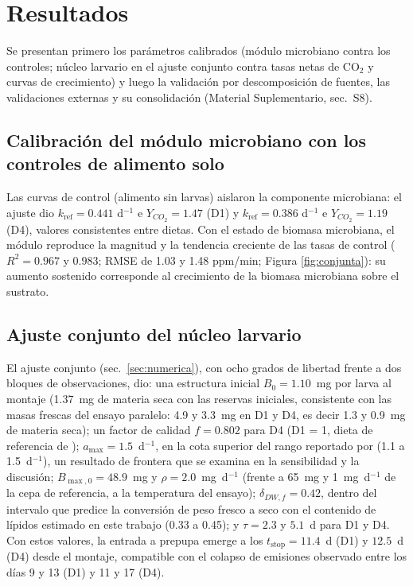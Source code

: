 \section{Resultados}
\label{sec:resultados}

Se presentan primero los parámetros calibrados (módulo microbiano contra los controles; núcleo larvario en el ajuste conjunto contra tasas netas de CO$_2$ y curvas de crecimiento) y luego la validación por descomposición de fuentes, las validaciones externas y su consolidación (Material Suplementario, sec.~S8).


\subsection{Calibración del módulo microbiano con los controles de alimento solo}

Las curvas de control (alimento sin larvas) aislaron la componente microbiana: el ajuste dio $k_{\mathrm{ref}} = 0.441$ d$^{-1}$ e $Y_{CO_2} = 1.47$ (D1) y $k_{\mathrm{ref}} = 0.386$ d$^{-1}$ e $Y_{CO_2} = 1.19$ (D4), valores consistentes entre dietas. Con el estado de biomasa microbiana, el módulo reproduce la magnitud y la tendencia creciente de las tasas de control ($R^2 = 0.967$ y $0.983$; RMSE de 1.03 y 1.48 ppm/min; Figura \ref{fig:conjunta}): su aumento sostenido corresponde al crecimiento de la biomasa microbiana sobre el sustrato.

\subsection{Ajuste conjunto del núcleo larvario}

El ajuste conjunto (sec.~\ref{sec:numerica}), con ocho grados de libertad frente a dos bloques de observaciones, dio: una estructura inicial $B_0 = 1.10$~mg por larva al montaje (1.37~mg de materia seca con las reservas iniciales, consistente con las masas frescas del ensayo paralelo: 4.9 y 3.3~mg en D1 y D4, es decir 1.3 y 0.9~mg de materia seca); un factor de calidad $f = 0.802$ para D4 (D1 = 1, dieta de referencia de \textcite{eriksenDynamicModellingFeed2022}); $a_{\max} = 1.5$~d$^{-1}$, en la cota superior del rango reportado por \textcite{eriksenDynamicModellingFeed2022} (1.1 a 1.5~d$^{-1}$), un resultado de frontera que se examina en la sensibilidad y la discusión; $B_{\max,0} = 48.9$~mg y $\rho = 2.0$~mg~d$^{-1}$ (frente a 65~mg y 1~mg~d$^{-1}$ de la cepa de referencia, a la temperatura del ensayo); $\delta_{DW,f} = 0.42$, dentro del intervalo que predice la conversión de peso fresco a seco con el contenido de lípidos estimado en este trabajo (0.33 a 0.45); y $\tau = 2.3$ y $5.1$~d para D1 y D4. Con estos valores, la entrada a prepupa emerge a los $t_{\mathrm{stop}} = 11.4$~d (D1) y $12.5$~d (D4) desde el montaje, compatible con el colapso de emisiones observado entre los días 9 y 13 (D1) y 11 y 17 (D4).

